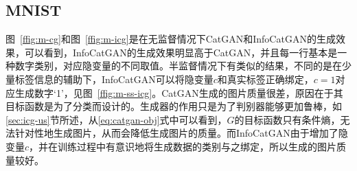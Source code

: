 \subsection{MNIST}\label{sec:icg-ex}

图~\ref{ffig:m-cg}和图~\ref{ffig:m-icg}是在无监督情况下CatGAN和InfoCatGAN的生成效果，可以看到，InfoCatGAN的生成效果明显高于CatGAN，并且每一行基本是一种数字类别，对应隐变量的不同取值。半监督情况下有类似的结果，不同的是在少量标签信息的辅助下，InfoCatGAN可以将隐变量$c$和真实标签正确绑定，$c=1$对应生成数字`1'，见图~\ref{ffig:m-ss-icg}。CatGAN生成的图片质量很差，原因在于其目标函数是为了分类而设计的。生成器的作用只是为了判别器能够更加鲁棒，如\ref{sec:icg-us}节所述，从\eqref{eq:catgan-obj}式中可以看到，$G$的目标函数只有条件熵，无法针对性地生成图片，从而会降低生成图片的质量。而InfoCatGAN由于增加了隐变量$c$，并在训练过程中有意识地将生成数据的类别与之绑定，所以生成的图片质量较好。

